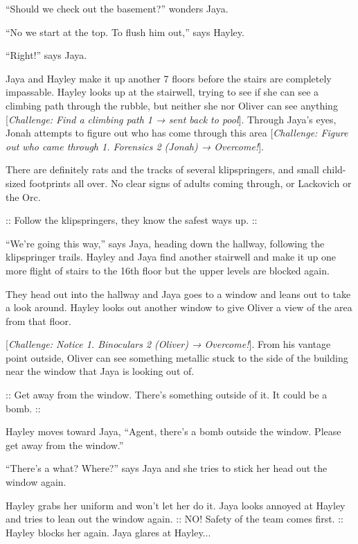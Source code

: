 ``Should we check out the basement?'' wonders Jaya.

``No we start at the top.  To flush him out,'' says Hayley.

``Right!'' says Jaya.  



Jaya and Hayley make it up another 7 floors before the stairs are completely impassable. Hayley looks up at the stairwell, trying to see if she can see a climbing path through the rubble, but neither she nor Oliver can see anything {[}\textit{Challenge: Find a climbing path 1 → sent back to pool}{]}.  Through Jaya's eyes, Jonah attempts to figure out who has come through this area {[}\textit{Challenge: Figure out who came through 1.  Forensics 2 (Jonah) → Overcome!}{]}.  



There are definitely rats and the tracks of several klipspringers, and small child-sized footprints all over.  No clear signs of adults coming through, or Lackovich or the Orc.

:: {\color[RGB]{60,120,216}Follow the klipspringers, they know the safest ways up.} ::

``We're going this way,'' says Jaya, heading down the hallway, following the klipspringer trails.  Hayley and Jaya find another stairwell and make it up one more flight of stairs to the 16th floor but the upper levels are blocked again.



They head out into the hallway and Jaya goes to a window and leans out to take a look around.  Hayley looks out another window to give Oliver a view of the area from that floor.

{[}\textit{Challenge: Notice 1.  Binoculars 2 (Oliver) → Overcome!}{]}. From his vantage point outside, Oliver can see something metallic stuck to the side of the building near the window that Jaya is looking out of.

:: {\color[RGB]{106,168,79}Get away from the window.  There's something outside of it.  It could be a bomb.} ::

Hayley moves toward Jaya, ``Agent, there's a bomb outside the window.  Please get away from the window.''

``There's a what?  Where?'' says Jaya and she tries to stick her head out the window again.

Hayley grabs her uniform and won't let her do it.  Jaya looks annoyed at Hayley and tries to lean out the window again.  :: {\color[RGB]{230,145,56}NO! Safety of the team comes first.} ::  Hayley blocks her again.  Jaya glares at Hayley...



